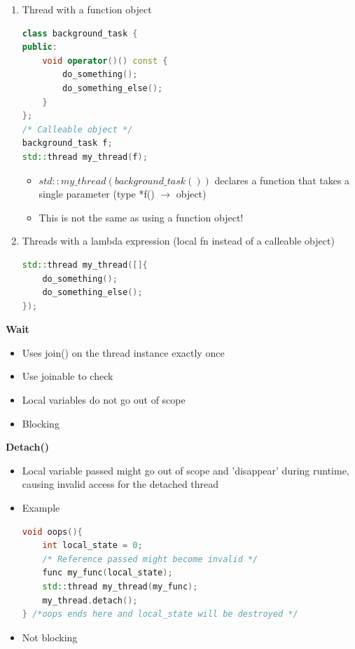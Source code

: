 \documentclass[10pt, landscape]{article}
\begin{document}
\begin{multicols}{4}
\begin{enumerate}
    \item Thread with a function object 
    \begin{lstlisting}[language=c++, breaklines=true, breakatwhitespace=true]
class background_task {
public: 
    void operator()() const {
        do_something();
        do_something_else();
    }
};
/* Calleable object */
background_task f;
std::thread my_thread(f);
    \end{lstlisting}
    \begin{itemize}
        \item  $std:: my\_thread(background\_task())$ declares a function that takes a single parameter (type *f() $\rightarrow$ object)
        \item This is not the same as using a function object!
    \end{itemize}
\item Threads with a lambda expression (local fn instead of a calleable object) 
\begin{lstlisting}[language=c++, breaklines=true, breakatwhitespace=true]
std::thread my_thread([]{
    do_something();
    do_something_else();
});
\end{lstlisting}
\end{enumerate}

\textbf{Wait} \\ 
\begin{itemize}
    \item Uses join() on the thread instance exactly once 
    \item Use joinable to check
    \item Local variables do not go out of scope 
    \item Blocking
\end{itemize}

\textbf{Detach()} \\ 
\begin{itemize}
    \item Local variable passed might go out of scope and 'disappear' during runtime, causing invalid access for the detached thread 
    \item Example 
    \begin{lstlisting}[language=c++, breaklines=true, breakatwhitespace=true]
void oops(){
    int local_state = 0;
    /* Reference passed might become invalid */
    func my_func(local_state);
    std::thread my_thread(my_func);
    my_thread.detach();
} /*oops ends here and local_state will be destroyed */
    \end{lstlisting}
    \item Not blocking 
\end{itemize}



\end{multicols}
\end{document}
